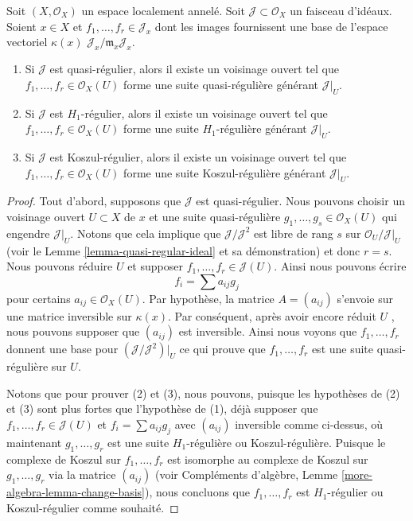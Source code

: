 \begin{lemma}
\label{lemma-generate-regular-ideal}
Soit  $(X, \mathcal{O}_X)$  un espace localement annelé. Soit  $\mathcal{J} \subset \mathcal{O}_X$  un faisceau
d'idéaux. Soient  $x \in X$  et  $f_1, \ldots, f_r \in \mathcal{J}_x$  dont les images fournissent une base
de l'espace vectoriel  $\kappa(x)$  $\mathcal{J}_x/\mathfrak m_x\mathcal{J}_x$.
\begin{enumerate}
\item Si  $\mathcal{J}$  est quasi-régulier, alors il existe un voisinage ouvert tel que
 $f_1, \ldots, f_r \in \mathcal{O}_X(U)$  forme une suite quasi-régulière générant  $\mathcal{J}|_U$.
\item Si  $\mathcal{J}$  est  $H_1$-régulier, alors il existe un voisinage ouvert tel
que  $f_1, \ldots, f_r \in \mathcal{O}_X(U)$  forme une suite  $H_1$-régulière générant  $\mathcal{J}|_U$.
\item Si  $\mathcal{J}$  est Koszul-régulier, alors il existe un voisinage ouvert tel que
 $f_1, \ldots, f_r \in \mathcal{O}_X(U)$  forme une suite Koszul-régulière générant  $\mathcal{J}|_U$.
\end{enumerate}
\end{lemma}

\begin{proof}
Tout d'abord, supposons que  $\mathcal{J}$  est quasi-régulier. Nous pouvons choisir
un voisinage ouvert  $U \subset X$  de  $x$  et une suite quasi-régulière
 $g_1, \ldots, g_s \in \mathcal{O}_X(U)$  qui engendre  $\mathcal{J}|_U$. Notons que cela implique que  $\mathcal{J}/\mathcal{J}^2$ 
est libre de rang  $s$  sur  $\mathcal{O}_U/\mathcal{J}|_U$  (voir le Lemme  \ref{lemma-quasi-regular-ideal}  et sa
démonstration) et donc  $r = s$. Nous pouvons réduire  $U$  et supposer
 $f_1, \ldots, f_r \in \mathcal{J}(U)$. Ainsi nous pouvons écrire
$$
f_i = \sum a_{ij} g_j
$$
pour certains  $a_{ij} \in \mathcal{O}_X(U)$. Par hypothèse, la matrice  $A = (a_{ij})$  s'envoie sur
une matrice inversible sur  $\kappa(x)$. Par conséquent, après avoir encore réduit
 $U$ , nous pouvons supposer que  $(a_{ij})$  est inversible. Ainsi nous
voyons que  $f_1, \ldots, f_r$  donnent une base pour  $(\mathcal{J}/\mathcal{J}^2)|_U$  ce qui prouve que
 $f_1, \ldots, f_r$  est une suite quasi-régulière sur  $U$.

\medskip\noindent
Notons que pour prouver (2) et (3), nous pouvons, puisque les hypothèses de (2) et
(3) sont plus fortes que l'hypothèse de (1), déjà supposer que  $f_1, \ldots, f_r \in \mathcal{J}(U)$  et
 $f_i = \sum a_{ij}g_j$  avec  $(a_{ij})$  inversible comme ci-dessus, où maintenant
 $g_1, \ldots, g_r$  est une suite  $H_1$-régulière ou Koszul-régulière. Puisque le
complexe de Koszul sur  $f_1, \ldots, f_r$  est isomorphe au complexe de Koszul sur
 $g_1, \ldots, g_r$  via la matrice  $(a_{ij})$  (voir Compléments d'algèbre, Lemme
 \ref{more-algebra-lemma-change-basis}), nous concluons que  $f_1, \ldots, f_r$  est  $H_1$-régulier ou
Koszul-régulier comme souhaité.
\end{proof}

